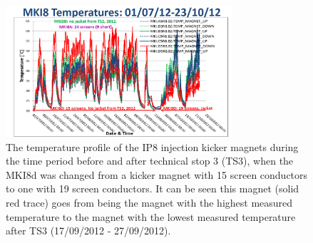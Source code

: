 \begin{figure}
\begin{center}
\includegraphics[width=0.75\textwidth]{LHC_MKI/figures/mki8-temps-post-ts3.png}
\end{center}
\caption{The temperature profile of the IP8 injection kicker magnets during the time period before and after technical stop 3  (TS3), when the MKI8d was changed from a kicker magnet with 15 screen conductors to one with 19 screen conductors. It can be seen this magnet (solid red trace) goes from being the magnet with the highest measured temperature to the magnet with the lowest measured temperature after TS3 (17/09/2012 - 27/09/2012).}
\label{fig:heating-mki8-post-ts3}
\end{figure}